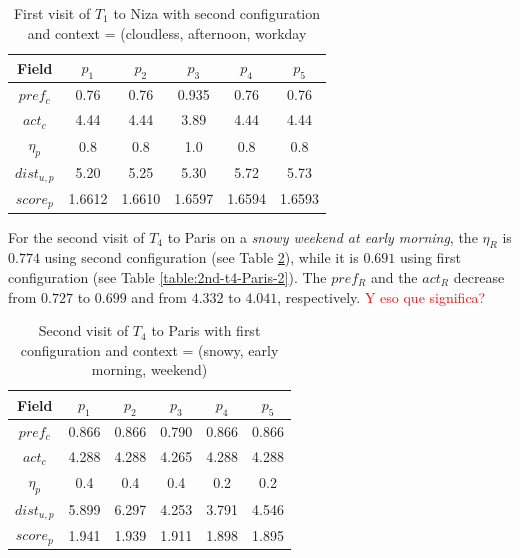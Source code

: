 \begin{table}[h!]
    \centering
        \caption{First visit of $T_1$ to Niza with second configuration and context = (cloudless,  afternoon, workday}
    \label{table:2nd-t1-niza-1}
    \begin{tabular}{ |c|c|c|c|c|c| } 
        \hline
        Field   & $p_1$ & $p_2$ & $p_3$ & $p_4$ & $p_5$ \\
        \hline
        $pref_c$    &  0.76 & 0.76 & 0.935 & 0.76 & 0.76 \\
        $act_c$     & 4.44 & 4.44 & 3.89 & 4.44 & 4.44  \\
        $\eta_p$    & 0.8 & 0.8 & 1.0 & 0.8 & 0.8 \\
        $dist_{u,p}$ & 5.20 & 5.25 & 5.30 & 5.72 & 5.73 \\
        $score_p$    & 1.6612 & 1.6610 & 1.6597 & 1.6594 & 1.6593 \\
        
        \hline
    \end{tabular}
\end{table}

For the second visit of $T_4$ to Paris on a {\it snowy weekend at early morning}, the $\eta_R$ is $0.774$ using second configuration (see Table \ref{table:1st-t4-Paris-2}), while it is $0.691$ using first configuration (see Table \ref{table:2nd-t4-Paris-2}). The $pref_R$ and the $act_R$ decrease from $0.727$ to $0.699$ and from $4.332$ to $4.041$, respectively. \textcolor{red}{Y eso que significa?}

\begin{table}[h!]
    \centering
        \caption{Second visit of $T_4$ to Paris with first configuration and context = (snowy, early morning, weekend)}
    \label{table:1st-t4-Paris-2}
    \begin{tabular}{ |c|c|c|c|c|c| } 
        \hline
        Field   & $p_1$ & $p_2$ & $p_3$ & $p_4$ & $p_5$ \\
        \hline
        $pref_c$    &  0.866 & 0.866 & 0.790 & 0.866 & 0.866 \\
        $act_c$     & 4.288 & 4.288 & 4.265 & 4.288 & 4.288  \\
        $\eta_p$    & 0.4 & 0.4 & 0.4 & 0.2 & 0.2 \\
        $dist_{u,p}$ & 5.899 & 6.297 & 4.253 & 3.791 & 4.546 \\
        $score_p$    & 1.941 & 1.939 & 1.911 & 1.898 & 1.895 \\
        
        \hline
    \end{tabular}
\end{table}

